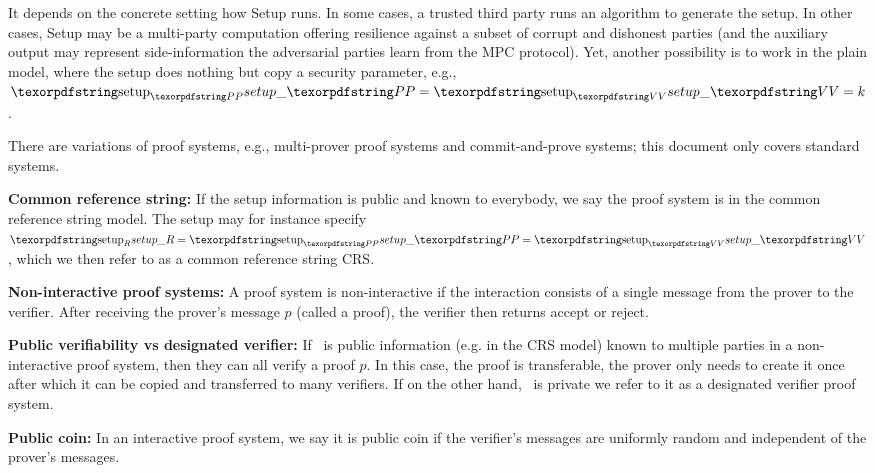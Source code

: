 It depends on the concrete setting how Setup runs. 
In some cases, a trusted third party runs an algorithm to generate the setup. 
In other cases, Setup may be a multi-party computation offering resilience against a subset of corrupt and dishonest parties (and the auxiliary output may represent side-information the adversarial parties learn from the MPC protocol). 
Yet, another possibility is to work in the plain model, where the setup does nothing but copy a security parameter, e.g., $\setP = \setV = k$.
 
There are variations of proof systems, e.g., multi-prover proof systems and commit-and-prove systems; this document only covers standard systems.
 
\textbf{Common reference string:} If the setup information is public and known to everybody, we say the proof system is in the common reference string model. 
The setup may for instance specify $\setR = \setP = \setV$, which we then refer to as a common reference string CRS.
 
\textbf{Non-interactive proof systems:} 
A proof system is non-interactive if the interaction consists of a single message from the prover to the verifier.
After receiving the prover’s message $p$ (called a proof), the verifier then returns accept or reject.
 
\textbf{Public verifiability vs designated verifier:} 
If \setV\ is public information (e.g. in the CRS model) known to multiple parties in a non-interactive proof system, then they can all verify a proof $p$. 
In this case, the proof is transferable, the prover only needs to create it once after which it can be copied and transferred to many verifiers. 
If on the other hand, \setV\ is private we refer to it as a designated verifier proof system.
 
\textbf{Public coin:} 
In an interactive proof system, we say it is public coin if the verifier’s messages are uniformly random and independent of the prover’s messages.

